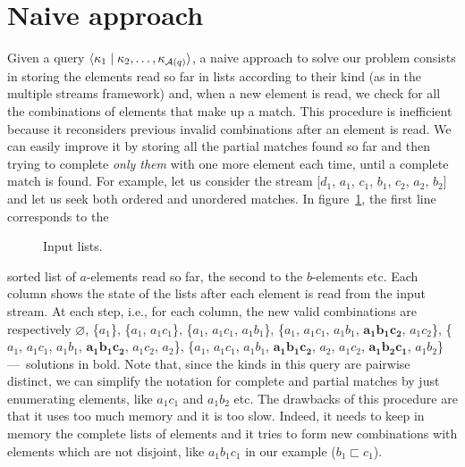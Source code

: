 
\section{Naive approach}
\label{naive}
 
\noindent Given a query \(\langle \kappa_1 \mid \kappa_2, \dots,
  \kappa_{{\cal A}(q)}\rangle\), a naive approach to solve our problem
consists in storing the elements read so far in lists according to
their kind (as in the multiple streams framework) and, when a new
element is read, we check for all the combinations of elements that
make up a match. This procedure is inefficient because it reconsiders
previous invalid combinations after an element is read. We can easily
improve it by storing all the partial matches found so far and then
trying to complete \emph{only them} with one more element each time,
until a complete match is found. For example, let us consider the
stream [\(d_1\), \(a_1\), \(c_1\), \(b_1\), \(c_2\), \(a_2\), \(b_2\)]
and let us seek both ordered and unordered matches. In
figure~\ref{input_lists}, the first line corresponds to the
\begin{wrapfigure}[8]{r}{0pt}
\centering
{}
\caption{Input lists.\label{input_lists}}
\end{wrapfigure}
sorted list of \(a\)-elements read so far, the second to the
\(b\)-elements etc. Each column shows the state of the lists after
each element is read from the input stream.  At each step, i.e., for
each column, the new valid combinations are respectively
\(\varnothing\), \{\(a_1\)\}, \{\(a_1\), \(a_1c_1\)\}, \{\(a_1\),
\(a_1c_1\), \(a_1b_1\)\}, \{\(a_1\), \(a_1c_1\), \(a_1b_1\),
\(\mathbf{a_1b_1c_2}\), \(a_1c_2\)\}, \{\(a_1\), \(a_1c_1\),
\(a_1b_1\), \(\mathbf{a_1b_1c_2}\), \(a_1c_2\), \(a_2\)\}, \{\(a_1\),
\(a_1c_1\), \(a_1b_1\), \(\mathbf{a_1b_1c_2}\), \(a_2\), \(a_1c_2\),
\(\mathbf{a_1b_2c_1}\), \(a_1b_2\)\} ---~solutions in bold. Note that,
since the kinds in this query are pairwise distinct, we can simplify
the notation for complete and partial matches by just enumerating
elements, like \(a_1c_1\) and \(a_1b_2\) etc. The drawbacks of this
procedure are that it uses too much memory and it is too slow. Indeed,
it needs to keep in memory the complete lists of elements and it tries
to form new combinations with elements which are not disjoint, like
\(a_1b_1c_1\) in our example (\(b_1 \sqsubset c_1\)).
